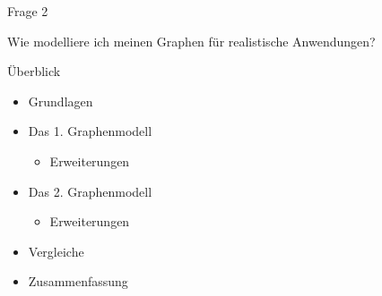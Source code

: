 \begin{frame}{Frage 2}
	\vspace{6em}
	\begin{center}
		\begin{Large}
			Wie modelliere ich meinen Graphen für realistische Anwendungen?
		\end{Large}
	\end{center}
\end{frame}


\begin{frame}{Überblick}
	\begin{itemize}
		\item Grundlagen
	\end{itemize}
	\vspace{1em}
	\begin{itemize}
		\item Das 1. Graphenmodell
		\begin{itemize}
			\item Erweiterungen
		\end{itemize}
	\end{itemize}
	\vspace{1em}
	\begin{itemize}
		\item Das 2. Graphenmodell
		\begin{itemize}
			\item Erweiterungen
		\end{itemize}
	\end{itemize}
	\vspace{1em}
	\begin{itemize}
		\item Vergleiche
	\end{itemize}
	\vspace{1em}
	\begin{itemize}
		\item Zusammenfassung
	\end{itemize}
\end{frame}


